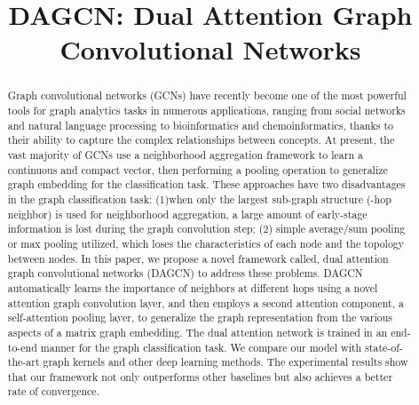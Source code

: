 \documentclass[conference]{IEEEtran}
\begin{document}
\title{DAGCN: Dual Attention Graph Convolutional Networks}

\author{
}


\maketitle

	\begin{abstract}
        Graph convolutional networks (GCNs) have recently become one of the most powerful tools for graph analytics tasks in numerous applications, ranging from social networks and natural language processing to bioinformatics and chemoinformatics, thanks to their ability to capture the complex relationships between concepts. At present, the vast majority of GCNs use a neighborhood aggregation framework to learn a continuous and compact vector, then performing a pooling operation to generalize graph embedding for the classification task. These approaches have two disadvantages in the graph classification task: (1)when only the largest sub-graph structure (-hop neighbor) is used for neighborhood aggregation, a large amount of early-stage information is lost during the graph convolution step; (2) simple average/sum pooling or max pooling utilized, which loses the characteristics of each node and the topology between nodes. In this paper, we propose a novel framework called, dual attention graph convolutional networks (DAGCN) to address these problems. DAGCN automatically learns the importance of neighbors at different hops using a novel attention graph convolution layer, and then employs a second attention component, a  self-attention pooling layer, to generalize the graph representation from the various aspects of a matrix graph embedding. The dual attention network is trained in an end-to-end manner for the graph classification task. We compare our model with state-of-the-art graph kernels and other deep learning methods. The experimental results show that our framework not only outperforms other baselines but also achieves a better rate of convergence.
	\end{abstract}
\end{document}
